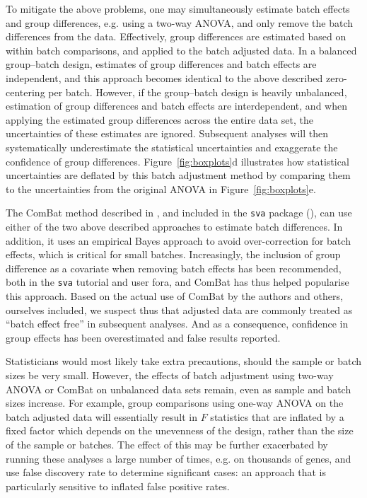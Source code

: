 \documentclass{bio}
\begin{document}
To mitigate the above problems, one may simultaneously estimate batch effects and group differences, e.g. using a two-way ANOVA, and only remove the batch differences from the data. Effectively, group differences are estimated based on within batch comparisons, and applied to the batch adjusted data. In a balanced group--batch design, estimates of group differences and batch effects are independent, and this approach becomes identical to the above described zero-centering per batch. However, if the group--batch design is heavily unbalanced, estimation of group differences and batch effects are interdependent, and when applying the estimated group differences across the entire data set, the uncertainties of these estimates are ignored. Subsequent analyses will then systematically underestimate the statistical uncertainties and exaggerate the confidence of group differences. Figure~\ref{fig:boxplots}d illustrates how statistical uncertainties are deflated by this batch adjustment method by comparing them to the uncertainties from the original ANOVA in Figure~\ref{fig:boxplots}e.

The ComBat method described in \citet{Johnson2007}, and included in the \texttt{sva} package (\citealp{Leek2012}), can use either of the two above described approaches to estimate batch differences. In addition, it uses an empirical Bayes approach to avoid over-correction for batch effects, which is critical for small batches. Increasingly, the inclusion of group difference as a covariate when removing batch effects has been recommended, both in the \texttt{sva} tutorial and user fora, and ComBat has thus helped popularise this approach. Based on the actual use of ComBat by the authors and others, ourselves included, we suspect thus that adjusted data are commonly treated as ``batch effect free'' in subsequent analyses. And as a consequence, confidence in group effects has been overestimated and false results reported.

Statisticians would most likely take extra precautions, should the sample or batch sizes be very small. However, the effects of batch adjustment using two-way ANOVA or ComBat on unbalanced data sets remain, even as sample and batch sizes increase. For example, group comparisons using one-way ANOVA on the batch adjusted data will essentially result in $F$ statistics that are inflated by a fixed factor which depends on the unevenness of the design, rather than the size of the sample or batches. The effect of this may be further exacerbated by running these analyses a large number of times, e.g. on thousands of genes, and use false discovery rate to determine significant cases: an approach that is particularly sensitive to inflated false positive rates.
\end{document}

